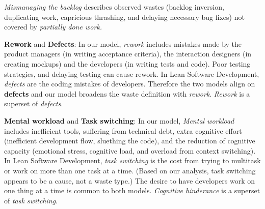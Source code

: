 \textit{Mismanaging the backlog} describes observed wastes (backlog inversion, duplicating work, capricious thrashing, and delaying necessary bug fixes) not covered by \textit{partially done work.}





\textbf{Rework} and \textbf{Defects}: In our model, \textit{rework} includes mistakes made by the product managers (in writing acceptance criteria), the interaction designers (in creating mockups) and the developers (in writing tests and code). Poor testing strategies, and delaying testing can cause rework. In Lean Software Development, \textit{defects} are the coding mistakes of developers. Therefore the two models align on \textbf{defects} and our model broadens the waste definition with \textit{rework}. \textit{Rework} is a superset of \textit{defects}. 

\textbf{Mental workload} and \textbf{Task switching}: In our model, \textit{Mental workload} includes inefficient tools, suffering from technical debt, extra cognitive effort (inefficient development flow, sluething the code), and the reduction of cognitive capacity (emotional stress, cognitive load, and overload from context switching). In Lean Software Development, \textit{task switching} is the cost from trying to multitask or work on more than one task at a time. (Based on our analysis, task switching appears to be a cause, not a waste type.) The desire to have developers work on one thing at a time is common to both models. \textit{Cognitive hinderance} is a superset of \textit{task switching}. 

